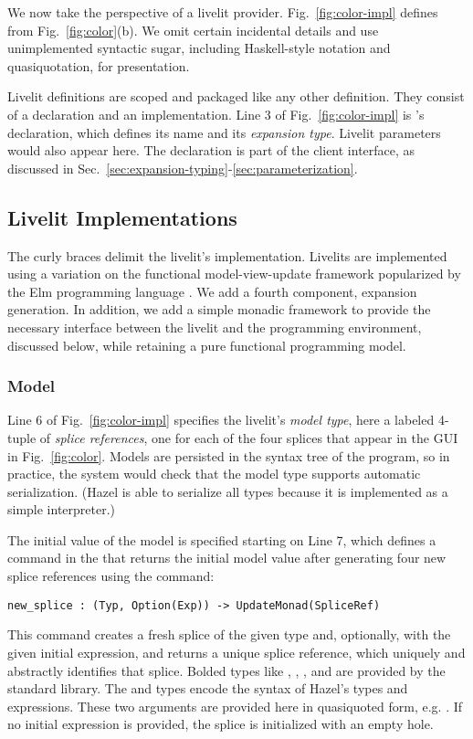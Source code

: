 \noindent
We now take the perspective of a livelit provider.
Fig.~\ref{fig:color-impl}
defines  from Fig.~\ref{fig:color}(b). We omit certain 
incidental details and use unimplemented syntactic sugar, including
Haskell-style  notation and quasiquotation, for presentation.

Livelit definitions are scoped and packaged like 
any other definition. They consist of a declaration and an implementation. 
Line 3 of Fig.~\ref{fig:color-impl} is 's declaration,
which defines its name and its \emph{expansion type}. 
Livelit parameters would also appear here. 
The declaration is part of the client interface, 
as discussed in Sec.~\ref{sec:expansion-typing}-\ref{sec:parameterization}. 

\subsection{Livelit Implementations}
The curly braces delimit the livelit's implementation. 
Livelits are implemented using a variation on the functional model-view-update
framework popularized by the Elm programming language \cite{ElmArchitecture}. We add a fourth component,
expansion generation. In addition, we add a simple monadic framework to provide the necessary  
interface between the livelit and the programming environment, discussed below, while retaining
a pure functional programming model.

\subsubsection{Model}\label{sec:model}
Line 6 of Fig.~\ref{fig:color-impl} specifies the livelit's \emph{model type},
here a labeled 4-tuple of \emph{splice references}, one for each of the four splices
that appear in the GUI in Fig.~\ref{fig:color}.
Models are persisted in the syntax tree of the program, so in practice,
 the system would check that the model type supports automatic serialization. 
 (Hazel is able to serialize all types because it is implemented as a 
 simple interpreter.)

The initial value of the model is specified starting on Line 7, 
which defines a command in the  that returns the 
initial model value after generating four new splice references
using the  command:
\begin{lstlisting}[numbers=none]
new_splice : (Typ, Option(Exp)) -> UpdateMonad(SpliceRef)
\end{lstlisting}
This command creates a fresh splice
of the given type and, optionally, with the given initial expression,
and returns a unique splice reference, which uniquely and abstractly identifies that splice.
Bolded types like , , , and 
are provided by the standard library. The  and  types 
encode the syntax of Hazel's types and expressions.
These two arguments are provided here in quasiquoted form, e.g.  \cite{bawden1999quasiquotation}. 
If no initial expression is provided, the splice is initialized with 
an empty hole.

